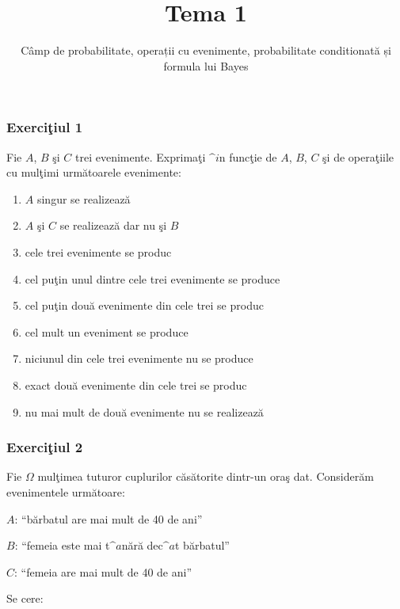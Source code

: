 \documentclass[]{article}
\title{Tema 1}
\subtitle{Câmp de probabilitate, operații cu evenimente, probabilitate
conditionată și formula lui Bayes}
\author{}
\date{}
\def\Om{\Omega}
\begin{document}
\maketitle

\thispagestyle{fancy}

\subsubsection{\texorpdfstring{Exerci\c tiul
1}{Exerciiul 1}}\label{exerciiul-1}

Fie \(A\), \(B\) \c si \(C\) trei evenimente. Exprima\c ti \(\^ i\)n
func\c tie de \(A\), \(B\), \(C\) \c si de opera\c tiile cu mul\c timi
urm\u atoarele evenimente:

\begin{enumerate}
\def\labelenumi{\alph{enumi})}
\item
  \(A\) singur se realizeaz\u a
\item
  \(A\) \c si \(C\) se realizeaz\u a dar nu \c si \(B\)
\item
  cele trei evenimente se produc
\item
  cel pu\c tin unul dintre cele trei evenimente se produce
\item
  cel pu\c tin dou\u a evenimente din cele trei se produc
\item
  cel mult un eveniment se produce
\item
  niciunul din cele trei evenimente nu se produce
\item
  exact dou\u a evenimente din cele trei se produc
\item
  nu mai mult de dou\u a evenimente nu se realizeaz\u a
\end{enumerate}

\subsubsection{\texorpdfstring{Exerci\c tiul
2}{Exerciiul 2}}\label{exerciiul-2}

Fie \(\Om\) mul\c timea tuturor cuplurilor c\u as\u atorite dintr-un
ora\c s dat. Consider\u am evenimentele urm\u atoare:

\(A\): ``b\u arbatul are mai mult de 40 de ani''

\(B\): ``femeia este mai t\(\^ a\)n\u ar\u a dec\(\^ a\)t b\u arbatul''

\(C\): ``femeia are mai mult de 40 de ani''

Se cere:
\end{document}
